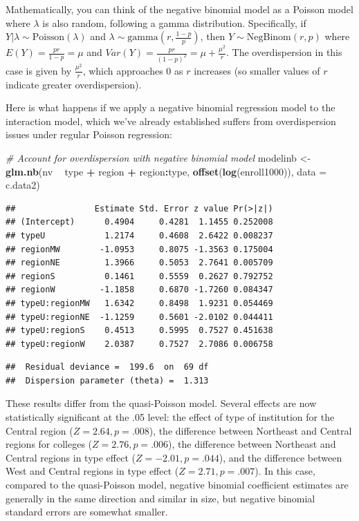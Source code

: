 \documentclass[
]{krantz}
\newenvironment{Shaded}{\begin{snugshade}}{\end{snugshade}}
\newcommand{\CommentTok}[1]{\textcolor[rgb]{0.37,0.37,0.37}{\textit{#1}}}
\newcommand{\DataTypeTok}[1]{\textcolor[rgb]{0.27,0.27,0.27}{#1}}
\newcommand{\KeywordTok}[1]{\textcolor[rgb]{0.27,0.27,0.27}{\textbf{#1}}}
\newcommand{\NormalTok}[1]{#1}
\newcommand{\OperatorTok}[1]{\textcolor[rgb]{0.43,0.43,0.43}{\textbf{#1}}}
\newcommand{\StringTok}[1]{\textcolor[rgb]{0.5,0.5,0.5}{#1}}
\begin{document}
Mathematically, you can think of the negative binomial model as a Poisson model where \(\lambda\) is also random, following a gamma distribution. Specifically, if \(Y|\lambda \sim \textrm{Poisson}(\lambda)\) and \(\lambda \sim \textrm{gamma}(r,\frac{1-p}{p})\), then \(Y \sim \textrm{NegBinom}(r,p)\) where \(E(Y)=\frac{pr}{1-p}=\mu\) and \(Var(Y)=\frac{pr}{(1-p)^2}=\mu+\frac{\mu^2}{r}\). The overdispersion in this case is given by \(\frac{\mu^2}{r}\), which approaches 0 as \(r\) increases (so smaller values of \(r\) indicate greater overdispersion).

Here is what happens if we apply a negative binomial regression model  to the interaction model, which we've already established suffers from overdispersion issues under regular Poisson regression:

\begin{Shaded}
\begin{Highlighting}[]
\CommentTok{# Account for overdispersion with negative binomial model}
\NormalTok{modelinb <-}\StringTok{ }\KeywordTok{glm.nb}\NormalTok{(nv }\OperatorTok{~}\StringTok{ }\NormalTok{type }\OperatorTok{+}\StringTok{ }\NormalTok{region }\OperatorTok{+}\StringTok{ }\NormalTok{region}\OperatorTok{:}\NormalTok{type, }
               \KeywordTok{offset}\NormalTok{(}\KeywordTok{log}\NormalTok{(enroll1000)), }\DataTypeTok{data =}\NormalTok{ c.data2)}
\end{Highlighting}
\end{Shaded}

\begin{verbatim}
##                Estimate Std. Error z value Pr(>|z|)
## (Intercept)      0.4904     0.4281  1.1455 0.252008
## typeU            1.2174     0.4608  2.6422 0.008237
## regionMW        -1.0953     0.8075 -1.3563 0.175004
## regionNE         1.3966     0.5053  2.7641 0.005709
## regionS          0.1461     0.5559  0.2627 0.792752
## regionW         -1.1858     0.6870 -1.7260 0.084347
## typeU:regionMW   1.6342     0.8498  1.9231 0.054469
## typeU:regionNE  -1.1259     0.5601 -2.0102 0.044411
## typeU:regionS    0.4513     0.5995  0.7527 0.451638
## typeU:regionW    2.0387     0.7527  2.7086 0.006758
\end{verbatim}

\begin{verbatim}
##  Residual deviance =  199.6  on  69 df 
##  Dispersion parameter (theta) =  1.313
\end{verbatim}

These results differ from the quasi-Poisson model. Several effects are now statistically significant at the .05 level: the effect of type of institution for the Central region (\(Z=2.64, p=.008\)), the difference between Northeast and Central regions for colleges (\(Z=2.76, p=.006\)), the difference between Northeast and Central regions in type effect (\(Z=-2.01, p=.044\)), and the difference between West and Central regions in type effect (\(Z=2.71, p=.007\)). In this case, compared to the quasi-Poisson model, negative binomial coefficient estimates are generally in the same direction and similar in size, but negative binomial standard errors are somewhat smaller.
\end{document}
